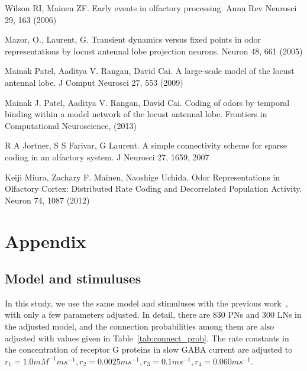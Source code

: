 \documentclass[12pt, a4paper]{article}
\begin{document}
\begin{thebibliography}{99} \scriptsize

Wilson RI, Mainen ZF. Early events in olfactory processing. Annu Rev Neurosci 29, 163 (2006)

Mazor, O., Laurent, G. Transient dynamics versus fixed points in odor representations by locust antennal lobe projection neurons. Neuron 48, 661 (2005)

Mainak Patel, Aaditya V. Rangan, David Cai. A large-scale model of the locust antennal lobe. J Comput Neurosci 27, 553 (2009)

Mainak J. Patel, Aaditya V. Rangan, David Cai. Coding of odors by temporal binding within a model network of the locust antennal lobe. Frontiers in Computational Neuroscience, (2013)

R A Jortner, S S Farivar, G Laurent. A simple connectivity scheme for sparse coding in an olfactory system. J Neurosci 27, 1659, 2007

Keiji Miura, Zachary F. Mainen, Naoshige Uchida. Odor Representations in Olfactory Cortex: Distributed Rate Coding and Decorrelated Population Activity. Neuron 74, 1087 (2012)

\end{thebibliography}

\section*{Appendix} \label{Sect:appendix}
\subsection*{Model and stimuluses} \label{Sect:model}
In this study, we use the same model and stimuluses with the previous work~\citep{}, with only a few parameters adjusted. In detail, there are 830 PNs and 300 LNs in the adjusted model, and the connection probabilities among them are also adjusted with values given in Table~\ref{tab:connect_prob}. The rate constants in the concentration of receptor G proteins in slow GABA current are adjusted to $r_1 = 1.0 mM^{-1}ms^{-1}, r_2 = 0.0025 ms^{-1}, r_3 = 0.1 ms^{-1}, r_4 = 0.060 ms^{-1}$.
\end{document}

